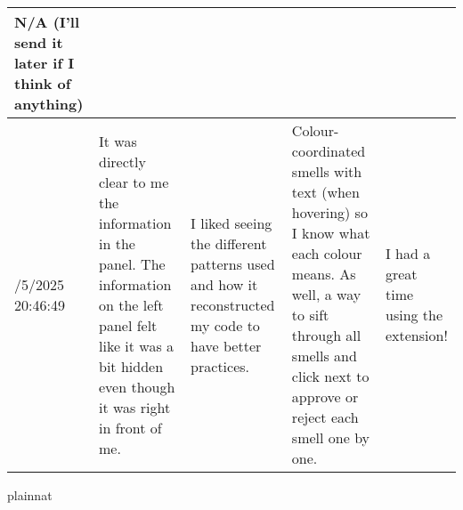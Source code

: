 \documentclass{article}
\begin{document}
\begin{table}[htbp]
\begin{tabularx}{\linewidth}{@{}>{\RaggedRight}p{1.8cm} >{\RaggedRight}X >{\RaggedRight}X >{\RaggedRight}X >{\RaggedRight}X@{}}
    N/A (I'll send it later if I think of anything) \\
    \midrule
    3/5/2025 20:46:49 & 
    It was directly clear to me the information in the panel. The information on the left panel felt like it was a bit hidden even though it was right in front of me. & 
    I liked seeing the different patterns used and how it reconstructed my code to have better practices. & 
    Colour-coordinated smells with text (when hovering) so I know what each colour means. As well, a way to sift through all smells and click next to approve or reject each smell one by one. & 
    I had a great time using the extension! \\
    \bottomrule
\end{tabularx}
\end{table}
    


 {plainnat}

\end{document}

